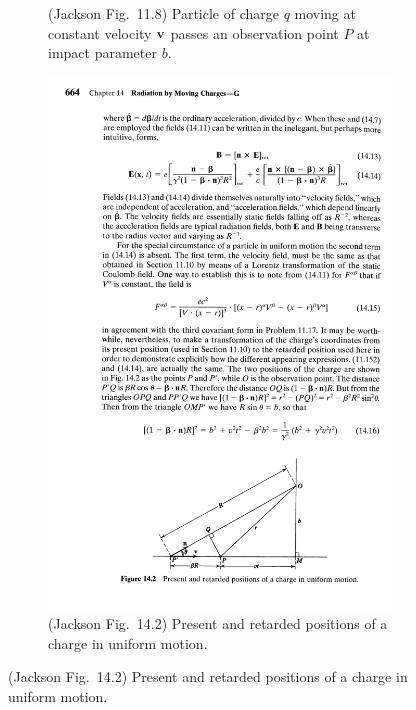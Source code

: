 \begin{figure}[b!]
\begin{minipage}{0.475\textwidth}
\begin{figure}[H]
			\caption{(Jackson Fig.~11.8) Particle of charge $q$ moving at constant velocity $\vb{v}$ passes an observation point $P$ at impact parameter $b$.}
			\label{11.8}
		\end{figure}
	\end{minipage}%
	\hspace{0.05\linewidth}%
	\begin{minipage}{0.475\textwidth}
		\begin{figure}[H] \centering
			\includegraphics{14-2}
			\caption{(Jackson Fig.~14.2) Present and retarded positions of a charge in uniform motion. \vspace{27.5pt}}
			\label{14.2}
		\end{figure}
	\end{minipage}
\end{figure}

